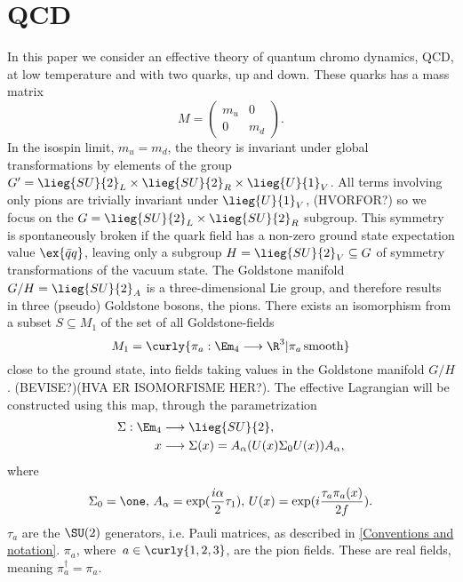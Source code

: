 \section{QCD}

In this paper we consider an effective theory of quantum chromo dynamics, QCD, at low temperature and with two quarks, up and down.
These quarks has a mass matrix 
\begin{equation}
    \label{Mass matrix}
    M =
    \begin{pmatrix}
        m_u & 0 \\
        0 & m_d
    \end{pmatrix}.
\end{equation}
In the isospin limit, $m_u = m_d$, the theory is invariant under global transformations by elements of the group $G' = \lieg{SU}{2}_L \times \lieg{SU}{2}_R \times \lieg{U}{1}_V$.
All terms involving only pions are trivially invariant under $\lieg{U}{1}_V$, (HVORFOR?) so we focus on the $G = \lieg{SU}{2}_L \times \lieg{SU}{2}_R$ subgroup.
This symmetry is spontaneously broken if the quark field has a non-zero ground state expectation value $\ex{\bar q q}$, leaving only a subgroup $H = \lieg{SU}{2}_V \subseteq G$ of symmetry transformations of the vacuum state.
The Goldstone manifold $G/H = \lieg{SU}{2}_A$ is a three-dimensional Lie group, and therefore results in three (pseudo) Goldstone bosons, the pions.
There exists an isomorphism from a subset $S \subseteq M_1$ of the set of all Goldstone-fields
\begin{equation*}
    M_1 = \curly{ \pi_a: \Em_4 \longrightarrow \R^3 | \pi_a \, \mathrm{smooth} }
\end{equation*}
close to the ground state, into fields taking values in the Goldstone manifold $G/H$. (BEVISE?)(HVA ER ISOMORFISME HER?).
The \chpt effective Lagrangian will be constructed using this map, through the parametrization
\begin{align}
\label{sigma}
    \Sigma : \Em_4 & \longrightarrow \lieg{SU}{2},\\ \notag
    x & \longrightarrow \Sigma(x) = A_\alpha (U(x) \Sigma_0 U(x)) A_\alpha,
\end{align}
where
\begin{align*}
    \Sigma_0 = \one,\, 
    A_\alpha = \exp(\frac{i \alpha}{2} \tau_1),\, 
    U(x) = \exp(i \frac{\tau_a\pi_a(x)}{2f}).
\end{align*}
$\tau_a$ are the $\SU(2)$ generators, i.e. Pauli matrices, as described in \autoref{Conventions and notation}.
$\pi_a$, where $ \, a \in \curly{1, 2, 3}$, are the pion fields. These are real fields, meaning $\pi_a^\dagger = \pi_a$.
